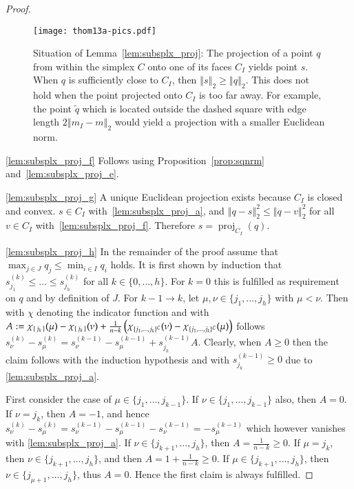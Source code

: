 \documentclass[twoside,11pt]{article}
\DeclareMathOperator{\proj}{proj}
\newcommand{\0}{\mathcal{O}}
\newcommand{\norm}[1]{\left\Vert#1\right\Vert}
\newcommand{\discint}[2]{\{#1,\dotsc,#2\}}
\newcommand{\inint}[2]{\in\discint{#1}{#2}}
\begin{document}
\begin{proof}
\begin{figure}[t]
  \centering
  \texttt{[image: thom13a-pics.pdf]}
  \caption{Situation of Lemma~\ref{lem:subsplx_proj}: The projection of a point $q$ from within the simplex $C$ onto one of its faces $C_I$ yields point $s$. When $q$ is sufficiently close to $C_I$, then $\norm{s}_2\geq\norm{q}_2$. This does not hold when the point projected onto $C_I$ is too far away. For example, the point $\tilde{q}$ which is located outside the dashed square with edge length $2\norm{m_I - m}_2$ would yield a projection with a smaller Euclidean norm.}
  \label{fig:simplexface_proj}
\end{figure}
\ref{lem:subsplx_proj_f}
Follows using Proposition~\ref{prop:sqnrm} and~\ref{lem:subsplx_proj_e}.

\ref{lem:subsplx_proj_g}
A unique Euclidean projection exists because $C_I$ is closed and convex.
$s\in C_I$ with~\ref{lem:subsplx_proj_a}, and $\norm{q - s}_2^2 \leq \norm{q - v}_2^2$ for all $v\in C_I$ with~\ref{lem:subsplx_proj_f}.
Therefore $s = \proj_{C_I}(q)$.

\ref{lem:subsplx_proj_h}
In the remainder of the proof assume that $\max_{j\in J}q_j \leq \min_{i\in I}q_i$ holds.
It is first shown by induction that $s^{(k)}_{j_1} \leq \dots \leq s^{(k)}_{j_h}$ for all $k\inint{0}{h}$.
For $k=0$ this is fulfilled as requirement on $q$ and by definition of $J$.
For $k - 1\to k$, let $\mu,\nu\inint{j_1}{j_h}$ with $\mu < \nu$.
Then with $\chi$ denoting the indicator function and with $A := \chi_{\set{j_k}}(\mu) - \chi_{\set{j_k}}(\nu) + \tfrac{1}{n-k}\left(\chi_{\discint{j_1}{j_k}^C}(\nu) - \chi_{\discint{j_1}{j_k}^C}(\mu)\right)$ follows $s^{(k)}_\nu - s^{(k)}_\mu = s^{(k-1)}_\nu - s^{(k-1)}_\mu + s^{(k-1)}_{j_k}A$.
Clearly, when $A\geq 0$ then the claim follows with the induction hypothesis and with $s^{(k-1)}_{j_k} \geq 0$ due to \ref{lem:subsplx_proj_a}.

First consider the case of $\mu\in\discint{j_1}{j_{k-1}}$. 
If $\nu\in\discint{j_1}{j_{k-1}}$ also, then $A = 0$.
If $\nu = j_k$, then $A = -1$, and hence $s^{(k)}_\nu - s^{(k)}_\mu = s^{(k-1)}_\nu - s^{(k-1)}_\mu - s^{(k-1)}_{\nu} = - s^{(k-1)}_\mu$ which however vanishes with \ref{lem:subsplx_proj_a}.
If $\nu\in\discint{j_{k+1}}{j_h}$, then $A = \tfrac{1}{n-k}\geq 0$.
If $\mu = j_k$, then $\nu\inint{j_{k+1}}{j_h}$, and then $A = 1 + \tfrac{1}{n-k}\geq 0$.
If $\mu\inint{j_{k+1}}{j_h}$, then $\nu\inint{j_{\mu+1}}{j_h}$, thus $A = 0$.
Hence the first claim is always fulfilled.


\end{proof}
\end{document}

